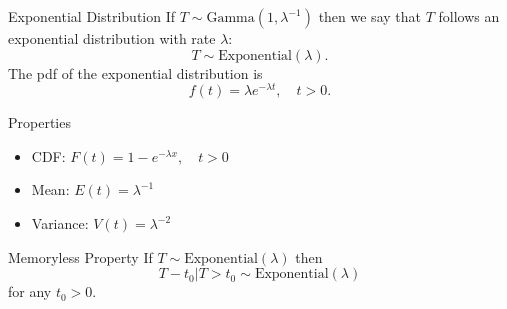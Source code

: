 \begin{frame}
  \begin{block}{Exponential Distribution}
    If $T \sim \mbox{Gamma}(1,\lambda^{-1})$ then we say that $T$ follows an exponential distribution with rate $\lambda$:
    \[
      T \sim \mbox{Exponential}(\lambda).
    \]
    The pdf of the exponential distribution is
    \[
      f(t)=\lambda e^{-\lambda t},\quad t > 0.
    \]
  \end{block}

  \vspace{-.1in}
  
  \begin{block}{Properties}
        \begin{itemize}
        \item CDF: $F(t)=1-e^{-\lambda x}, \quad t > 0$


        \item Mean: $E(t)=\lambda^{-1}$
      
        \item Variance: $V(t)=\lambda^{-2}$


        \end{itemize}
  \end{block} 
\end{frame}

\begin{frame}

  \begin{block}{Memoryless Property}
  If $T \sim \mbox{Exponential}(\lambda)$ then
      \[
        T-t_0|T>t_0 \sim \mbox{Exponential}(\lambda) 
      \]
  for any $t_0 > 0$. 
  \end{block}
\end{frame}

